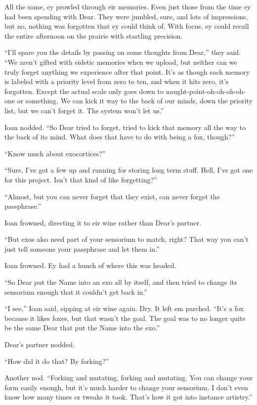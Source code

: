 All the same, ey prowled through eir memories. Even just those from the time ey had been spending with Dear. They were jumbled, sure, and lots of impressions, but no, nothing was forgotten that ey could think of. With focus, ey could recall the entire afternoon on the prairie with startling precision.

``I'll spare you the details by passing on some thoughts from Dear,'' they said. ``We aren't gifted with eidetic memories when we upload, but neither can we truly forget anything we experience after that point. It's as though each memory is labeled with a priority level from zero to ten, and when it hits zero, it's forgotten. Except the actual scale only goes down to naught-point-oh-oh-oh-oh-one or something. We can kick it way to the back of our minds, down the priority list, but we can't forget it. The system won't let us.''

Ioan nodded. ``So Dear tried to forget, tried to kick that memory all the way to the back of its mind. What does that have to do with being a fox, though?''

``Know much about exocortices?''

``Sure, I've got a few up and running for storing long term stuff. Hell, I've got one for this project. Isn't that kind of like forgetting?''

``Almost, but you can never forget that they exist, can never forget the passphrase.''

Ioan frowned, directing it to eir wine rather than Dear's partner.

``But exos also need part of your sensorium to match, right? That way you can't just tell someone your passphrase and let them in.''

Ioan frowned. Ey had a hunch of where this was headed.

``So Dear put the Name into an exo all by itself, and then tried to change its sensorium enough that it couldn't get back in.''

``I see,'' Ioan said, sipping at eir wine again. Dry. It left em parched. ``It's a fox because it likes foxes, but that wasn't the goal. The goal was to no longer quite be the same Dear that put the Name into the exo.''

Dear's partner nodded.

``How did it do that? By forking?''

Another nod. ``Forking and mutating, forking and mutating. You can change your form easily enough, but it's much harder to change your sensorium. I don't even know how many times or tweaks it took. That's how it got into instance artistry.''

